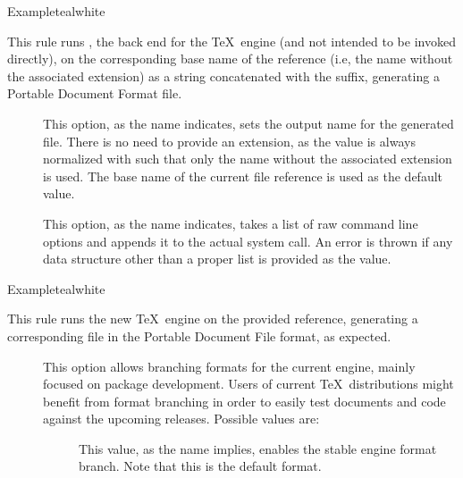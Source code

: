 \begin{description}
\begin{codebox}{Example}{teal}{\icnote}{white}
\end{codebox}

\item[\rulebox{xdvipdfmx}]
This rule runs , the back end for the  \TeX\ engine (and not intended to be invoked directly), on the corresponding base name of the  reference (i.e, the name without the associated extension) as a string concatenated with the  suffix, generating a Portable Document Format  file.

\begin{description}
\item[] This option, as the name indicates, sets the output name for the generated  file. There is no need to provide an extension, as the value is always normalized with  such that only the name without the associated extension is used. The base name of the current file reference is used as the default value.

\item[] This option, as the name indicates, takes a list of raw command line options and appends it to the actual system call. An error is thrown if any data structure other than a proper list is provided as the value.
\end{description}

\begin{codebox}{Example}{teal}{\icnote}{white}
\end{codebox}

\item[\rulebox{xelatex}]
This rule runs the new  \TeX\ engine on the provided  reference, generating a corresponding file in the Portable Document File format, as expected.

\begin{description}
\item[] This option allows branching formats for the current engine, mainly focused on package development. Users of current \TeX\ distributions might benefit from format branching in order to easily test documents and code against the upcoming releases. Possible values are:

\begin{description}
\item[] This value, as the name implies, enables the stable engine format branch. Note that this is the default format.


\end{description}
\end{description}
\end{description}
